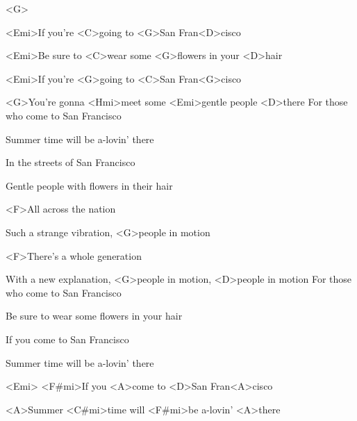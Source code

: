 

<G>

\zs
<Emi>If you're <C>going to <G>San Fran<D>cisco

<Emi>Be sure to <C>wear some <G>flowers in your <D>hair

<Emi>If you're <G>going to <C>San Fran<G>cisco

<G>You're gonna <Hmi>meet some <Emi>gentle people <D>there
\ks
\zs
For those who come to San Francisco

Summer time will be a-lovin' there

In the streets of San Francisco

Gentle people with flowers in their hair
\ks

\zr
<F>All across the nation

Such a strange vibration, <G>people in motion

<F>There's a whole generation

With a new explanation, <G>people in motion, <D>people in motion
\kr
\zs
For those who come to San Francisco

Be sure to wear some flowers in your hair

If you come to San Francisco

Summer time will be a-lovin' there
\ks

\zs
<Emi> <F#mi>If you <A>come to <D>San Fran<A>cisco

<A>Summer <C#mi>time will <F#mi>be a-lovin' <A>there
\ks
\kp
